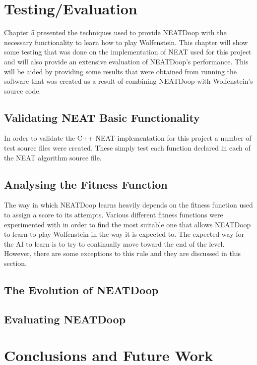 \documentclass[]{Learning-to-Play-Wolfenstein-thesis}
\begin{document}

\chapter{\label{Chapter6}Testing/Evaluation}%
Chapter 5 presented the techniques used to provide NEATDoop with the necessary functionality to learn how to play Wolfenstein. This chapter will show some testing that was done on the implementation of NEAT used for this project and will also provide an extensive evaluation of NEATDoop's performance. This will be aided by providing some results that were obtained from running the software that was created as a result of combining NEATDoop with Wolfenstein's source code.

\section{Validating NEAT Basic Functionality}
In order to validate the C++ NEAT implementation for this project a number of test source files were created. These simply test each function declared in each of the NEAT algorithm source file.

\section{Analysing the Fitness Function}
The way in which NEATDoop learns heavily depends on the fitness function used to assign a score to its attempts. Various different fitness functions were experimented with in order to find the most suitable one that allows NEATDoop to learn to play Wolfenstein in the way it is expected to. The expected way for the AI to learn is to try to continually move toward the end of the level. However, there are some exceptions to this rule and they are discussed in this section.

\section{The Evolution of NEATDoop}


\section{Evaluating NEATDoop}		%

\chapter{Conclusions and Future Work}%
\end{document}
